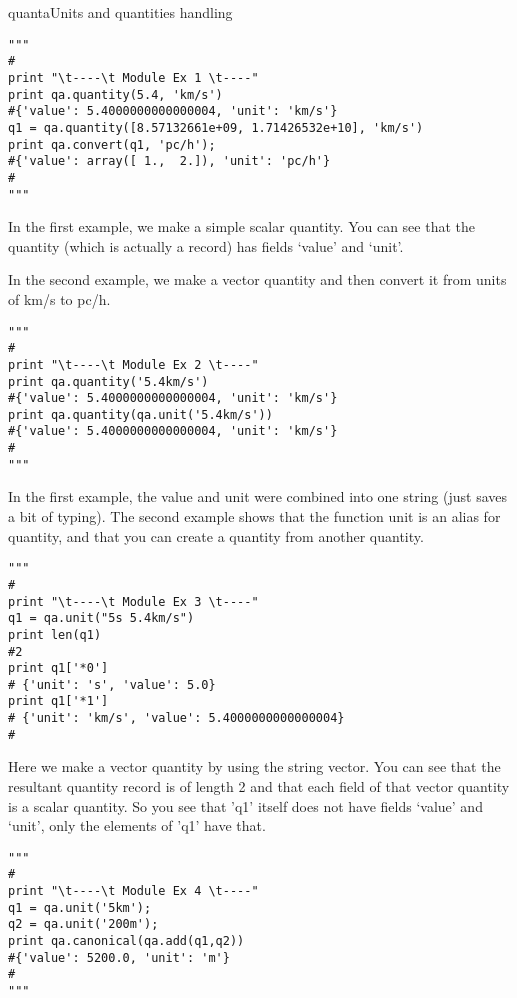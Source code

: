 \begin{ahmodule}{quanta}{Units and quantities handling}
\begin{ahdescription}
\begin{ahexample}
\begin{verbatim}
"""
#
print "\t----\t Module Ex 1 \t----"
print qa.quantity(5.4, 'km/s')
#{'value': 5.4000000000000004, 'unit': 'km/s'}
q1 = qa.quantity([8.57132661e+09, 1.71426532e+10], 'km/s')
print qa.convert(q1, 'pc/h');
#{'value': array([ 1.,  2.]), 'unit': 'pc/h'}
#
"""
\end{verbatim}

In the first example, we make a simple scalar quantity.
You can see that the quantity (which is actually a record)
has fields `value' and `unit'.   

In the second example, we make a vector quantity and then
convert it from units of km/s to pc/h.

\end{ahexample}

\begin{ahexample}
\begin{verbatim}
"""
#
print "\t----\t Module Ex 2 \t----"
print qa.quantity('5.4km/s')          
#{'value': 5.4000000000000004, 'unit': 'km/s'}
print qa.quantity(qa.unit('5.4km/s')) 
#{'value': 5.4000000000000004, 'unit': 'km/s'}
#
"""
\end{verbatim} 

In the first example, the value and unit were combined into one string
(just saves a bit of typing).  The second example shows that the
function {\stff unit} is an alias for {\stff quantity}, and that you can
create a quantity from another quantity. 

\end{ahexample} 

\begin{ahexample}
\begin{verbatim}
"""
#
print "\t----\t Module Ex 3 \t----"
q1 = qa.unit("5s 5.4km/s")	
print len(q1)
#2
print q1['*0']
# {'unit': 's', 'value': 5.0}
print q1['*1']
# {'unit': 'km/s', 'value': 5.4000000000000004}
#
\end{verbatim} 

Here we make a vector quantity by using the string vector.  You can
see that the resultant quantity record is of length 2 and that each
field of that vector quantity is a scalar quantity.  So you see that
'q1' itself does not have fields `value' and `unit', only the
elements of 'q1' have that.

\end{ahexample} 

\begin{ahexample}
\begin{verbatim}
"""
#
print "\t----\t Module Ex 4 \t----"
q1 = qa.unit('5km');
q2 = qa.unit('200m');
print qa.canonical(qa.add(q1,q2))
#{'value': 5200.0, 'unit': 'm'}
#
"""
\end{verbatim} 


\end{ahexample}
\end{ahdescription}
\end{ahmodule}
